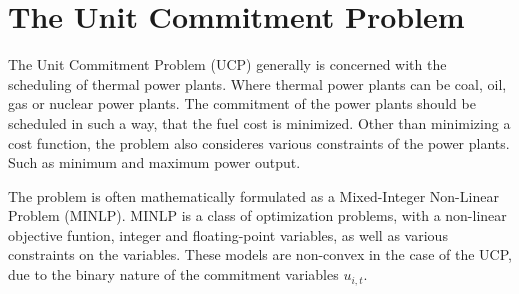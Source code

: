 \section{The Unit Commitment Problem}

The Unit Commitment Problem (UCP) generally is concerned with the scheduling of thermal power plants.
Where thermal power plants can be coal, oil, gas or nuclear power plants.
The commitment of the power plants should be scheduled in such a way, that the fuel cost is minimized.
Other than minimizing a cost function, the problem also consideres various constraints of the power plants.
Such as minimum and maximum power output.
\cite{Baldick1995}

The problem is often mathematically formulated as a Mixed-Integer Non-Linear Problem (MINLP).
MINLP is a class of optimization problems, with a non-linear objective funtion, integer and floating-point variables,
as well as various constraints on the variables.
These models are non-convex in the case of the UCP, due to the binary nature of the commitment variables $u_{i, t}$.
\cite{Abujarad2017}